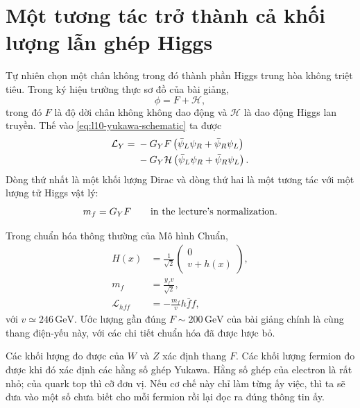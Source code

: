 \section{Một tương tác trở thành cả khối lượng lẫn ghép Higgs}

Tự nhiên chọn một chân không trong đó thành phần Higgs trung hòa không triệt tiêu. Trong ký hiệu trường thực sơ đồ của bài giảng,
\begin{equation}
  \phi=F+\mathcal H ,
  \label{eq:l10-f-plus-h}
\end{equation}
trong đó \(F\) là độ dời chân không không dao động và \(\mathcal H\) là dao động Higgs lan truyền. Thế vào
\eqref{eq:l10-yukawa-schematic} ta được
\begin{align}
  \mathcal L_Y
  ={}&
  -G_YF
  \left(\bar\psi_L\psi_R+\bar\psi_R\psi_L\right)
  \notag\\
  &-G_Y\mathcal H
  \left(\bar\psi_L\psi_R+\bar\psi_R\psi_L\right).
  \label{eq:l10-yukawa-split}
\end{align}
Dòng thứ nhất là một khối lượng Dirac và dòng thứ hai là một tương tác với một lượng tử Higgs vật lý:
\begin{equation}
  m_f=G_YF
  \qquad\hbox{in the lecture's normalization.}
  \label{eq:l10-mass-lecture-normalization}
\end{equation}

Trong chuẩn hóa thông thường của Mô hình Chuẩn,
\begin{equation}
\begin{aligned}
  H(x)&=\frac{1}{\sqrt2}
  \begin{pmatrix}
    0\\ v+h(x)
  \end{pmatrix},
  \\
  m_f&=\frac{y_fv}{\sqrt2},
  \\
  \mathcal L_{hff}&=-\frac{m_f}{v}h\bar f f,
\end{aligned}
  \label{eq:l10-standard-higgs-normalization}
\end{equation}
với \(v\simeq246\,\mathrm{GeV}\). Ước lượng gần đúng \(F\sim200\,\mathrm{GeV}\) của bài giảng chính là cùng thang điện-yếu này, với các chi tiết chuẩn hóa đã được lược bỏ.

Các khối lượng đo được của \(W\) và \(Z\) xác định thang \(F\). Các khối lượng fermion đo được khi đó xác định các hằng số ghép Yukawa. Hằng số ghép của electron là rất nhỏ; của quark top thì cỡ đơn vị. Nếu cơ chế này chỉ làm từng ấy việc, thì ta sẽ đưa vào một số chưa biết cho mỗi fermion rồi lại đọc ra đúng thông tin ấy.

